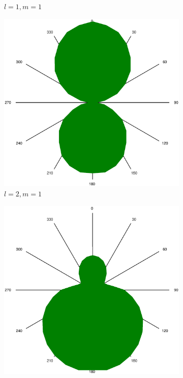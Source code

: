 \begin{figure}[!ht]
\begin{subfigure}{0.3\textwidth}
			\caption{$l = 1, m=1$}
			\label{fig:tv3-2}
		\end{subfigure}
		\begin{subfigure}{0.3\textwidth}
			\centering
			\includegraphics[width=\textwidth]{images/tv3-peak3-angle.eps}
			\caption{$l = 2, m=1$}
			\label{fig:tv3-3}
		\end{subfigure}
		\begin{subfigure}{0.3\textwidth}
			\centering
			\includegraphics[width=\textwidth]{images/tv3-peak3.5-angle.eps}

\end{subfigure}
\end{figure}

